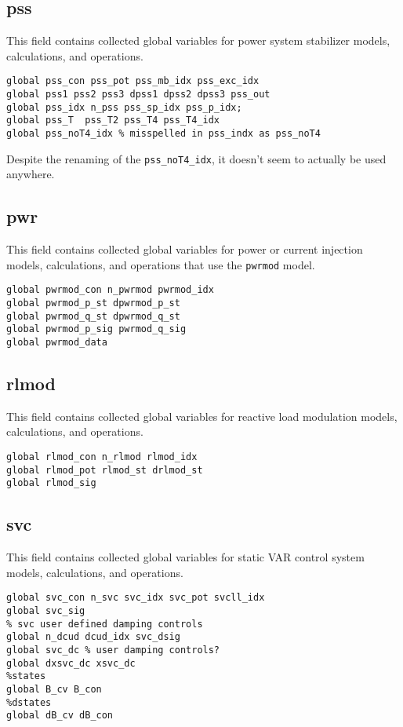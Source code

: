 \subsection{pss}
This field contains collected global variables for power system stabilizer models, calculations, and operations.
\begin{verbatim}
global pss_con pss_pot pss_mb_idx pss_exc_idx
global pss1 pss2 pss3 dpss1 dpss2 dpss3 pss_out
global pss_idx n_pss pss_sp_idx pss_p_idx;
global pss_T  pss_T2 pss_T4 pss_T4_idx  
global pss_noT4_idx % misspelled in pss_indx as pss_noT4
\end{verbatim}
Despite the renaming of the \verb|pss_noT4_idx|, it doesn't seem to actually be used anywhere.


\subsection{pwr}
This field contains collected global variables for power or current injection models, calculations, and operations that use the \verb|pwrmod| model.
\begin{verbatim}
global pwrmod_con n_pwrmod pwrmod_idx
global pwrmod_p_st dpwrmod_p_st
global pwrmod_q_st dpwrmod_q_st
global pwrmod_p_sig pwrmod_q_sig
global pwrmod_data
\end{verbatim}


\subsection{rlmod}
This field contains collected global variables for reactive load modulation models, calculations, and operations.
\begin{verbatim}
global rlmod_con n_rlmod rlmod_idx
global rlmod_pot rlmod_st drlmod_st
global rlmod_sig
\end{verbatim}

\subsection{svc}
This field contains collected global variables for static VAR control system models, calculations, and operations.
\begin{verbatim}
global svc_con n_svc svc_idx svc_pot svcll_idx
global svc_sig
% svc user defined damping controls
global n_dcud dcud_idx svc_dsig
global svc_dc % user damping controls?
global dxsvc_dc xsvc_dc
%states
global B_cv B_con
%dstates
global dB_cv dB_con
\end{verbatim}

